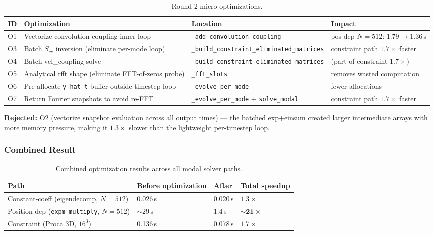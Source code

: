\begin{table}[htbp]
\centering
\caption{Round 2 micro-optimizations.}
\label{tab:modal-opt-round2}
\begin{tabular}{@{}llll@{}}
\toprule
ID & Optimization & Location & Impact \\
\midrule
O1 & Vectorize convolution coupling inner loop & \texttt{\_add\_convolution\_coupling} & pos-dep $N=512$: 1.79$\to$1.36\,s \\
O3 & Batch $S_{cc}$ inversion (eliminate per-mode loop) & \texttt{\_build\_constraint\_eliminated\_matrices} & constraint path $1.7\times$ faster \\
O4 & Batch vel\_coupling solve & \texttt{\_build\_constraint\_eliminated\_matrices} & (part of constraint $1.7\times$) \\
O5 & Analytical rfft shape (eliminate FFT-of-zeros probe) & \texttt{\_fft\_slots} & removes wasted computation \\
O6 & Pre-allocate \texttt{y\_hat\_t} buffer outside timestep loop & \texttt{\_evolve\_per\_mode} & fewer allocations \\
O7 & Return Fourier snapshots to avoid re-FFT & \texttt{\_evolve\_per\_mode} + \texttt{solve\_modal} & constraint path $1.7\times$ faster \\
\bottomrule
\end{tabular}
\end{table}

\textbf{Rejected:} O2 (vectorize snapshot evaluation across all output times) --- the batched exp+einsum created larger intermediate arrays with more memory pressure, making it $1.3\times$ slower than the lightweight per-timestep loop.

\subsubsection{Combined Result}
\label{sec:modal-opt-combined}

\begin{table}[htbp]
\centering
\caption{Combined optimization results across all modal solver paths.}
\label{tab:modal-opt-combined}
\begin{tabular}{@{}llll@{}}
\toprule
Path & Before optimization & After & Total speedup \\
\midrule
Constant-coeff (eigendecomp, $N=512$) & 0.026\,s & 0.020\,s & $\mathbf{1.3\times}$ \\
Position-dep (\texttt{expm\_multiply}, $N=512$) & ${\sim}29$\,s & 1.4\,s & $\mathbf{{\sim}21\times}$ \\
Constraint (Proca 3D, $16^3$) & 0.136\,s & 0.078\,s & $\mathbf{1.7\times}$ \\
\bottomrule
\end{tabular}
\end{table}

